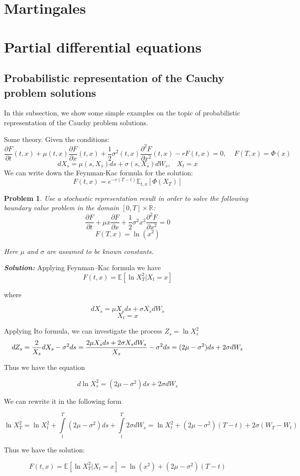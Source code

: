 \documentclass[a4paper, 12pt]{article}
\theoremstyle{problemstyle}
\newtheorem{problem}{Problem}[section]
\newenvironment{solution}
{\textit{\textbf{Solution:}}}
{}
\newcommand{\R}{\mathbb{R}}
\newcommand{\E}{\mathbb{E}}
\begin{document}
\section{Martingales}

\section{Partial differential equations}
\subsection{Probabilistic representation of the Cauchy problem solutions}

\noindent In this subsection, we show some simple examples on the topic of probabilistic representation of the Cauchy problem solutions.

Some theory. Given the conditions:
$$
\frac{\partial F}{\partial t}(t, x)  + \mu(t, x) \frac{\partial F}{\partial x}(t, x)  + \frac{1}{2} \sigma^2(t, x) \frac{\partial^2 F}{\partial x^2 }(t, x)
-rF(t, x)  = 0,
\;\;\;\; F(T, x) = \Phi(x)
$$
$$
dX_s = \mu(s, X_s) ds + \sigma(s, X_s)dW_s, \;\;\;  X_t = x
$$
We can write down the Feynman-Kac formula for the solution:
$$
F(t, x) = e^{-r(T-t)}\E_{t, x}[\Phi(X_T)]
$$
\begin{problem}
Use a stochastic representation result in order to solve the following boundary value problem in the domain  $[0, T] \times \R$:
$$
\frac{\partial F}{\partial t} + \mu x \frac{\partial F}{\partial x} + \frac{1}{2} \sigma^2 x^2 \frac{\partial^2 F}{\partial x^2 } = 0
$$    
$$
F(T,x) = \ln(x^2) 
$$

Here $\mu$ and $\sigma$ are assumed to be known constants.

\end{problem}

\begin{solution}
    Applying Feynman–Kac formula we have
$$
F(t,x) = \E[\ln X_T^2| X_t = x]
$$

where

$$
dX_s = \mu X_s ds + \sigma X_s dW_s
$$
$$
X_t = x
$$

Applying Ito formula, we can investigate the process $Z_s = \ln X_s^2$
$$
d Z_s = \frac{2}{X_s}dX_s - \sigma^2 ds = \frac{2\mu X_s ds + 2 \sigma X_s dW_s}{X_s} - \sigma^2 ds = (2\mu - \sigma^2)ds + 2\sigma dW_s\\
$$

Thus we have the equation

$$
d \ln X^2_s = (2\mu - \sigma^2)ds + 2\sigma dW_s
$$

We can rewrite it in the following form

$$
\ln X_T^2= \ln X_t^2 + \int\limits_t^T (2\mu - \sigma^2) ds + \int\limits_{t}^{T}2\sigma dW_s = \ln X_t^2 + (2\mu - \sigma^2) (T-t) + 2\sigma (W_T - W_t)
$$

Thus we have the solution:

$$
F(t,x) = \E[\ln X_T^2| X_t = x] = \ln(x^2) + (2\mu - \sigma^2) (T-t)
$$
\end{solution}
\end{document}

